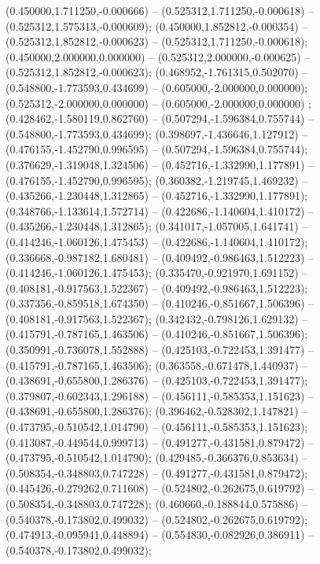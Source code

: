  (0.450000,1.711250,-0.000666) -- (0.525312,1.711250,-0.000618) -- (0.525312,1.575313,-0.000609);
 (0.450000,1.852812,-0.000354) -- (0.525312,1.852812,-0.000623) -- (0.525312,1.711250,-0.000618);
 (0.450000,2.000000,0.000000) -- (0.525312,2.000000,-0.000625) -- (0.525312,1.852812,-0.000623);
 (0.468952,-1.761315,0.502070) -- (0.548800,-1.773593,0.434699) -- (0.605000,-2.000000,0.000000);
 (0.525312,-2.000000,0.000000) -- (0.605000,-2.000000,0.000000) ;
 (0.428462,-1.580119,0.862760) -- (0.507294,-1.596384,0.755744) -- (0.548800,-1.773593,0.434699);
 (0.398697,-1.436646,1.127912) -- (0.476155,-1.452790,0.996595) -- (0.507294,-1.596384,0.755744);
 (0.376629,-1.319048,1.324506) -- (0.452716,-1.332990,1.177891) -- (0.476155,-1.452790,0.996595);
 (0.360382,-1.219745,1.469232) -- (0.435266,-1.230448,1.312865) -- (0.452716,-1.332990,1.177891);
 (0.348766,-1.133614,1.572714) -- (0.422686,-1.140604,1.410172) -- (0.435266,-1.230448,1.312865);
 (0.341017,-1.057005,1.641741) -- (0.414246,-1.060126,1.475453) -- (0.422686,-1.140604,1.410172);
 (0.336668,-0.987182,1.680481) -- (0.409492,-0.986463,1.512223) -- (0.414246,-1.060126,1.475453);
 (0.335470,-0.921970,1.691152) -- (0.408181,-0.917563,1.522367) -- (0.409492,-0.986463,1.512223);
 (0.337356,-0.859518,1.674350) -- (0.410246,-0.851667,1.506396) -- (0.408181,-0.917563,1.522367);
 (0.342432,-0.798126,1.629132) -- (0.415791,-0.787165,1.463506) -- (0.410246,-0.851667,1.506396);
 (0.350991,-0.736078,1.552888) -- (0.425103,-0.722453,1.391477) -- (0.415791,-0.787165,1.463506);
 (0.363558,-0.671478,1.440937) -- (0.438691,-0.655800,1.286376) -- (0.425103,-0.722453,1.391477);
 (0.379807,-0.602343,1.296188) -- (0.456111,-0.585353,1.151623) -- (0.438691,-0.655800,1.286376);
 (0.396462,-0.528302,1.147821) -- (0.473795,-0.510542,1.014790) -- (0.456111,-0.585353,1.151623);
 (0.413087,-0.449544,0.999713) -- (0.491277,-0.431581,0.879472) -- (0.473795,-0.510542,1.014790);
 (0.429485,-0.366376,0.853634) -- (0.508354,-0.348803,0.747228) -- (0.491277,-0.431581,0.879472);
 (0.445426,-0.279262,0.711608) -- (0.524802,-0.262675,0.619792) -- (0.508354,-0.348803,0.747228);
 (0.460660,-0.188844,0.575886) -- (0.540378,-0.173802,0.499032) -- (0.524802,-0.262675,0.619792);
 (0.474913,-0.095941,0.448894) -- (0.554830,-0.082926,0.386911) -- (0.540378,-0.173802,0.499032);
